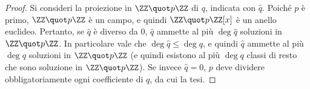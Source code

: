 \documentclass[12pt]{scrartcl}
\begin{document}
 	\begin{proof}
 		Si consideri la proiezione in $\ZZ \quot p \ZZ$ di $q$, indicata
 		con $\hat q$. Poiché $p$ è primo, $\ZZ \quot p \ZZ$ è un campo,
 		e quindi $\ZZ \quot p \ZZ[x]$ è un anello euclideo. Pertanto,
 		se $\hat q$ è diverso da $0$, $\hat q$ ammette al più
 		$\deg \hat q$ soluzioni in $\ZZ \quot p \ZZ$. In particolare
 		vale che $\deg \hat q \leq \deg q$, e quindi $\hat q$ ammette al
 		più $\deg q$ soluzioni in $\ZZ \quot p \ZZ$ (e quindi esistono al più
 		$\deg q$ classi di resto che sono soluzione in $\ZZ \quot p \ZZ$). Se
 		invece $\hat q = 0$, $p$ deve dividere obbligatoriamente
 		ogni coefficiente di $q$, da cui la tesi.
 	\end{proof}
\end{document}
